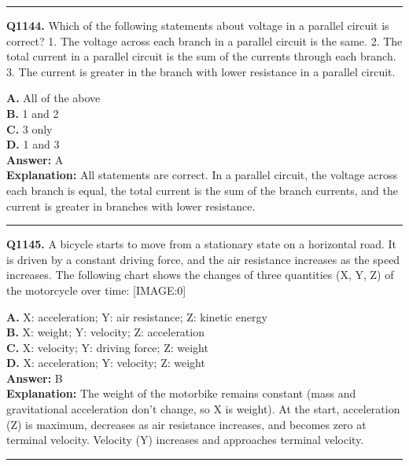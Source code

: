 \documentclass[12pt]{article}
\begin{document}
\hrule
\vspace{1em}


\noindent
\textbf{Q1144.} Which of the following statements about voltage in a parallel circuit is correct?
1.
The voltage across each branch in a parallel circuit is the same.
2.
The total current in a parallel circuit is the sum of the currents through each branch.
3.
The current is greater in the branch with lower resistance in a parallel circuit.



\textbf{A.} All of the above \\
\textbf{B.} 1 and 2 \\
\textbf{C.} 3 only \\
\textbf{D.} 1 and 3 \\

\textbf{Answer:} A \\
\textbf{Explanation:} All statements are correct. In a parallel circuit, the voltage across each branch is equal, the total current is the sum of the branch currents, and the current is greater in branches with lower resistance.

\hrule
\vspace{1em}


\noindent
\textbf{Q1145.} A bicycle starts to move from a stationary state on a horizontal road. It is driven by a constant driving force, and the air resistance increases as the speed increases. The following chart shows the changes of three quantities (X, Y, Z) of the motorcycle over time:
[IMAGE:0]



\textbf{A.} X: acceleration; Y: air resistance; Z: kinetic energy \\
\textbf{B.} X: weight; Y: velocity; Z: acceleration \\
\textbf{C.} X: velocity; Y: driving force; Z: weight \\
\textbf{D.} X: acceleration; Y: velocity; Z: weight \\

\textbf{Answer:} B \\
\textbf{Explanation:} The weight of the motorbike remains constant (mass and gravitational acceleration don’t change, so X is weight). At the start, acceleration (Z) is maximum, decreases as air resistance increases, and becomes zero at terminal velocity. Velocity (Y) increases and approaches terminal velocity.

\hrule
\vspace{1em}
\end{document}
